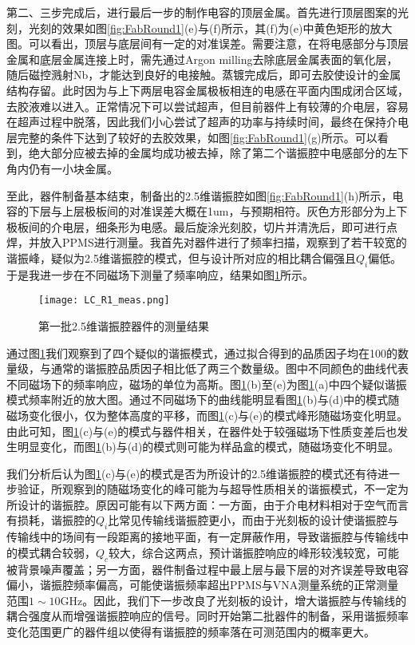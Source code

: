             第二、三步完成后，进行最后一步的制作电容的顶层金属。首先进行顶层图案的光刻，光刻的效果如图\ref{fig:FabRound1}(e)与(f)所示，其(f)为(e)中黄色矩形的放大图。可以看出，顶层与底层间有一定的对准误差。需要注意，在将电感部分与顶层金属和底层金属连接上时，需先通过Argon milling去除底层金属表面的氧化层，随后磁控溅射Nb，才能达到良好的电接触。蒸镀完成后，即可去胶使设计的金属结构存留。此时因为与上下两层电容金属极板相连的电感在平面内围成闭合区域，去胶液难以进入。正常情况下可以尝试超声，但目前器件上有较薄的介电层，容易在超声过程中脱落，因此我们小心尝试了超声的功率与持续时间，最终在保持介电层完整的条件下达到了较好的去胶效果，如图\ref{fig:FabRound1}(g)所示。可以看到，绝大部分应被去掉的金属均成功被去掉，除了第二个谐振腔中电感部分的左下角内仍有一小块金属。

            至此，器件制备基本结束，制备出的2.5维谐振腔如图\ref{fig:FabRound1}(h)所示，电容的下层与上层极板间的对准误差大概在1um，与预期相符。灰色方形部分为上下极板间的介电层，细条形为电感。最后旋涂光刻胶，切片并清洗后，即可进行点焊，并放入PPMS进行测量。我首先对器件进行了频率扫描，观察到了若干较宽的谐振峰，疑似为2.5维谐振腔的模式，但与设计所对应的相比耦合偏强且$Q_i$偏低。于是我进一步在不同磁场下测量了频率响应，结果如图\ref{fig:LC_R1_meas}所示。


            \begin{figure}[h]
                \centering
                \texttt{[image: LC\_R1\_meas.png]}
                \caption{第一批2.5维谐振腔器件的测量结果}
                \label{fig:LC_R1_meas}
            \end{figure}


            通过图\ref{fig:LC_R1_meas}我们观察到了四个疑似的谐振模式，通过拟合得到的品质因子均在100的数量级，与通常的谐振腔品质因子相比低了两三个数量级。图中不同颜色的曲线代表不同磁场下的频率响应，磁场的单位为高斯。图\ref{fig:LC_R1_meas}(b)至(e)为图\ref{fig:LC_R1_meas}(a)中四个疑似谐振模式频率附近的放大图。通过不同磁场下的曲线能明显看图\ref{fig:LC_R1_meas}(b)与(d)中的模式随磁场变化很小，仅为整体高度的平移，而图\ref{fig:LC_R1_meas}(c)与(e)的模式峰形随磁场变化明显。由此可知，图\ref{fig:LC_R1_meas}(c)与(e)的模式与器件相关，在器件处于较强磁场下性质变差后也发生明显变化，而图\ref{fig:LC_R1_meas}(b)与(d)的模式则可能为样品盒的模式，随磁场变化不明显。


            我们分析后认为图\ref{fig:LC_R1_meas}(c)与(e)的模式是否为所设计的2.5维谐振腔的模式还有待进一步验证，所观察到的随磁场变化的峰可能为与超导性质相关的谐振模式，不一定为所设计的谐振腔。原因可能有以下两方面：一方面，由于介电材料相对于空气而言有损耗，谐振腔的$Q_i$比常见传输线谐振腔更小，而由于光刻板的设计使谐振腔与传输线中的场间有一段距离的接地平面，有一定屏蔽作用，导致谐振腔与传输线中的模式耦合较弱，$Q_c$较大，综合这两点，预计谐振腔响应的峰形较浅较宽，可能被背景噪声覆盖；另一方面，器件制备过程中最上层与最下层的对齐误差导致电容偏小，谐振腔频率偏高，可能使谐振频率超出PPMS与VNA测量系统的正常测量范围$1\sim 10$GHz。因此，我们下一步改良了光刻板的设计，增大谐振腔与传输线的耦合强度从而增强谐振腔响应的信号。同时开始第二批器件的制备，采用谐振频率变化范围更广的器件组以使得有谐振腔的频率落在可测范围内的概率更大。

